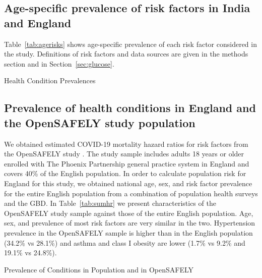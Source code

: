 \documentclass[10pt,letterpaper]{article}
\numberwithin{equation}{section}
\begin{document}
\subsection{Age-specific prevalence of risk factors in India and England}

Table~\ref{tab:agerisks} shows age-specific prevalence of each risk factor considered in the study. Definitions of risk factors and data sources are given in the methods section and in Section~\ref{sec:glucose}.

\begin{landscape}
  \begin{table}[H]
    \begin{center}
      \caption{Health Condition Prevalences}
      \label{tab:agerisks}
      
      
    \end{center}
  \end{table}
\end{landscape}

\clearpage
\subsection{Prevalence of health conditions in England and the OpenSAFELY study population}
We obtained estimated COVID-19 mortality hazard ratios for risk factors from the OpenSAFELY study \cite{williamson_opensafely_2020}. The study sample includes adults 18 years or older enrolled with The Phoenix Partnership general practice system in England and covers 40\% of the English population. In order to calculate population risk for England for this study, we obtained national age, sex, and risk factor prevalence for the entire English population from a combination of population health surveys and the GBD. In Table~\ref{tab:sumhr} we present characteristics of the OpenSAFELY study sample against those of the entire English population. Age, sex, and prevalence of most risk factors are very similar in the two. Hypertension prevalence in the OpenSAFELY sample is higher than in the English population (\num{34.2}\% vs \num{28.1}\%) and asthma and class I obesity are lower (\num{1.7}\% vs \num{9.2}\% and \num{19.1}\% vs \num{24.8}\%).


\begin{table}[H]
  \begin{center}
    \caption{Prevalence of Conditions in Population and in OpenSAFELY}
    \label{tab:sumhr}
    
    
  \end{center}
\end{table}
\end{document}
